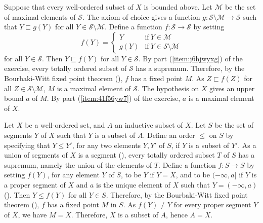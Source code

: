 \documentclass{article}
\begin{document}
\begin{solution}[\ref{exe:51daga9q}]
  Suppose that every well-ordered subset of \(X\) is bounded above.
  Let \(\mathcal{M}\) be the set of maximal elements of
  \(\mathcal{S}\).  The axiom of choice gives a function
  \(g : \mathcal{S} \setminus \mathcal{M} \to \mathcal{S}\) such that
  \(Y \sqsubset g(Y)\) for all
  \(Y \in \mathcal{S} \setminus \mathcal{M}\).  Define a function
  \(f : \mathcal{S} \to \mathcal{S}\) by setting
  \begin{displaymath}
    f(Y) =
    \begin{cases}
      Y & \text{if} ~ Y \in \mathcal{M} \\
      g(Y) & \text{if} ~ Y \in \mathcal{S} \setminus \mathcal{M}
    \end{cases}
  \end{displaymath}
  for all \(Y \in \mathcal{S}\).  Then \(Y \sqsubseteq f(Y)\) for all
  \(Y \in \mathcal{S}\).  By part (\ref{item:j6hjwyxg}) of the
  exercise, every totally ordered subset of \(\mathcal{S}\) has a
  supremum.  Therefore, by the Bourbaki-Witt fixed point theorem
  (), \(f\) has a fixed point \(M\).  As
  \(Z \sqsubset f(Z)\) for all
  \(Z \in \mathcal{S} \setminus \mathcal{M}\), \(M\) is a maximal
  element of \(\mathcal{S}\).  The hypothesis on \(X\) gives an upper
  bound \(a\) of \(M\).  By part (\ref{item:41f56yw7}) of the
  exercise, \(a\) is a maximal element of \(X\).
\end{solution}

\begin{solution}[\ref{exe:y5zl49rq}]
  \label{sol:s7zkr9t5}
  Let \(X\) be a well-ordered set, and \(A\) an inductive subset of
  \(X\).  Let \(S\) be the set of segments \(Y\) of \(X\) such that
  \(Y\) is a subset of \(A\).  Define an order \(\leq\) on \(S\) by
  specifying that \(Y \leq Y'\), for any two elements \(Y, Y'\) of
  \(S\), if \(Y\) is a subset of \(Y'\).  As a union of segments of
  \(X\) is a segment (), every totally ordered
  subset \(T\) of \(S\) has a supremum, namely the union of the
  elements of \(T\).  Define a function \(f : S \to S\) by setting
  \(f(Y)\), for any element \(Y\) of \(S\), to be \(Y\) if \(Y = X\),
  and to be \((-\infty, a]\) if \(Y\) is a proper segment of \(X\) and
  \(a\) is the unique element of \(X\) such that \(Y = (-\infty, a)\)
  ().  Then \(Y \leq f(Y)\) for all \(Y \in S\).
  Therefore, by the Bourbaki-Witt fixed point theorem
  (), \(f\) has a fixed point \(M\) in \(S\).  As
  \(f(Y) \neq Y\) for every proper segment \(Y\) of \(X\), we have
  \(M = X\).  Therefore, \(X\) is a subset of \(A\), hence \(A = X\).
\end{solution}
\end{document}
